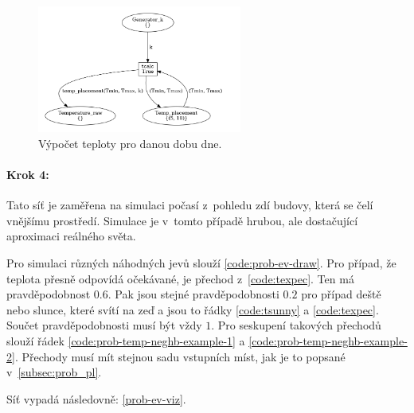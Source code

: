 \begin{figure}[htb]
 \centering
 \includegraphics[width=0.6\textwidth]{obrazky-figures/calc.png}
 \caption{Výpočet teploty pro danou dobu dne.}
 \label{therm-calc-viz}
\end{figure}

\paragraph{Krok 4:}

Tato síť je zaměřena na simulaci počasí z~pohledu zdí budovy, která se čelí vnějšímu prostředí. Simulace je v~tomto případě hrubou, ale dostačující aproximaci reálného světa.

Pro simulaci různých náhodných jevů slouží \ref{code:prob-ev-draw}. Pro případ, že teplota přesně odpovídá očekávané, je přechod  z~\ref{code:texpec}. Ten má pravděpodobnost $0.6$. Pak jsou stejné pravděpodobnosti $0.2$ pro případ deště nebo slunce, které svítí na zeď a jsou to řádky \ref{code:tsunny} a \ref{code:texpec}. Součet pravděpodobnosti musí být vždy $1$. Pro seskupení takových přechodů slouží řádek \ref{code:prob-temp-neghb-example-1} a \ref{code:prob-temp-neghb-example-2}. Přechody musí mít stejnou sadu vstupních míst, jak je to popsané v~\ref{subsec:prob_pl}.

Síť vypadá následovně: \ref{prob-ev-viz}.

